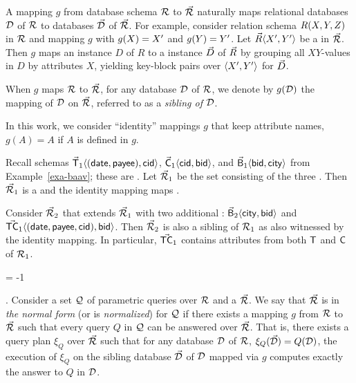 \vspace{0.6ex}
A mapping $g$ from database schema ${\mathcal R}$ to \bds
$\vec{{\mathcal R}}$ naturally maps relational databases $\mathcal D$ of ${\mathcal R}$ to
\baav databases $\vec{\mathcal D}$ of $\vec{{\mathcal R}}$.
For example, consider relation schema $R(X,\allowbreak Y,\allowbreak Z)$ in ${\mathcal R}$
and mapping $g$ with $g(X) \allowbreak =\allowbreak X'$ and $g(Y) \allowbreak = \allowbreak Y'$.
Let $\vec{R}\allowbreak \langle X',\allowbreak Y'\rangle$ be a \bs in $\vec{{\mathcal R}}$. Then $g$
maps an instance $D$ of $R$ to a \baav instance $\vec{D}$ of $\vec{R}$
by grouping all $XY$-values in $D$ by attributes $X$, yielding
key-block pairs over $\langle X',\allowbreak Y'\rangle$ for $\vec{D}$.

\vspace{0.6ex}
When $g$ maps ${\mathcal R}$ to $\vec{{\mathcal R}}$, for any database $\mathcal D$ of ${\mathcal R}$, we
denote by $g(\mathcal D)$ the mapping of $\mathcal D$ on $\vec{{\mathcal R}}$, referred to
as a {\em sibling of $\mathcal D$}.

In this work, we consider \kwlog ``identity'' mappings $g$ that keep
attribute names, \ie $g(A) = A$ if $A$ is defined in $g$.



\begin{example}\label{exa-mapping}
Recall schemas $\vec{\protect\mathsf{T}}_{1}\langle (\protect\mathsf{date},\allowbreak
\protect\mathsf{payee}),\allowbreak \protect\mathsf{cid}\rangle$,
$\vec{\protect\mathsf{C}}_{1}\langle \protect\mathsf{cid},\allowbreak \protect\mathsf{bid}\rangle$, and
$\vec{\protect\mathsf{B}}_{1}\langle \protect\mathsf{bid},\allowbreak \protect\mathsf{city}\rangle$ from
Example~\ref{exa-baav}; these are \bss. Let $\vec{{\mathcal R}}_{1}$ be
the set consisting of the three \bss. Then $\vec{{\mathcal R}}_{1}$ is a
\bds and the identity mapping maps
.

\vspace{0.6ex}
Consider \bds $\vec{{\mathcal R}}_{2}$ that extends $\vec{{\mathcal R}}_{1}$ with two
additional \bss:
$\vec{\protect\mathsf{B}}_{2}\langle \protect\mathsf{city},\allowbreak \protect\mathsf{bid}\rangle$ and
$\vec{\protect\mathsf{TC}}_{1}\langle (\protect\mathsf{date}, \protect\mathsf{payee},
  \protect\mathsf{cid}),\allowbreak \protect\mathsf{bid}\rangle$.
Then $\vec{{\mathcal R}}_{2}$ is also a sibling of ${\mathcal R}_{1}$ as
also witnessed by the identity mapping. In particular, $\vec{\protect\mathsf{TC}}_{1}$
contains attributes from both $\protect\mathsf{T}$ and $\protect\mathsf{C}$ of ${\mathcal R}_{1}$.
\end{example}
\looseness = -1

\vspace{-0.7ex}





.
Consider a set $\mathcal Q$ of parametric queries
over ${\mathcal R}$ and a \bds $\vec{{\mathcal R}}$. We say that $\vec{{\mathcal R}}$ is in
  {\em the normal form} (or is {\em normalized}) for $\mathcal Q$ if there exists a
mapping $g$ from ${\mathcal R}$ to $\vec{{\mathcal R}}$ such that every query $Q$ in $\mathcal Q$
can be answered over $\vec{{\mathcal R}}$. That is,  there exists a query plan
$\xi_{Q}$ over $\vec{{\mathcal R}}$ such that for any database $\mathcal D$ of ${\mathcal R}$,
$\xi_{Q}(\vec{\mathcal D}) = Q(\mathcal D)$, \ie the execution of 
$\xi_{Q}$ on the sibling \baav database $\vec{\mathcal D}$ of $\mathcal D$ mapped
via $g$ computes exactly the answer to $Q$ in $\mathcal D$.

